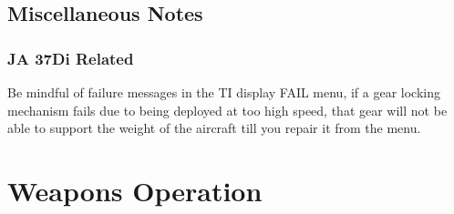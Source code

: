 \chapter{Miscellaneous Notes}
\section{JA 37Di Related}
Be mindful of failure messages in the TI display FAIL menu, if a gear locking mechanism fails due to being deployed at too high speed, that gear will not be able to support the weight of the aircraft till you repair it from the menu.

\part{Weapons Operation}

